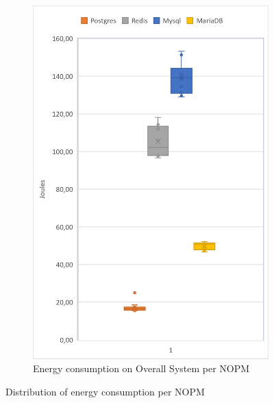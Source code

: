 \begin{figure}[!ht]
\begin{subfigure}[b]{0.32\textwidth}
                \includegraphics[width=1\columnwidth]{results/boxplot/10m/total-nopm.png}
            \caption[]%
            {{\small Energy consumption on Overall System per NOPM}}    
            \label{fig:bocplotnopmtotal10m}
        \end{subfigure}
        \caption[ Distribution of energy consumption per NOPM ]
        {\small Distribution of energy consumption per NOPM} 
        \label{fig:bocplotnumber10m}
    \end{figure}
    
    
